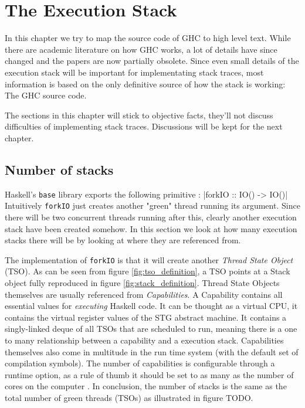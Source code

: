\chapter{The Execution Stack}

In this chapter we try to map the source code of GHC to high level text.
While there are academic literature on how GHC works, a lot of details have
since changed and the papers are now partially obsolete. Since even
small details of the execution stack will be important for implementating stack traces,
most information is based on the only definitive source of how the
stack is working: The GHC source code.

The sections in this chapter will stick to objective facts,
they'll not discuss difficulties of implementing stack traces.
Discussions will be kept for the next chapter.

\section{Number of stacks}

Haskell's \texttt{base} library exports the following primitive \cite{base_forkIO}:
|forkIO :: IO() -> IO()|
Intuitively \texttt{forkIO} just creates another "green" thread running its argument.
Since there will be two concurrent threads running after this, clearly
another execution stack have been created somehow. In this section we
look at how many execution stacks there will be by looking at
where they are referenced from.

The implementation of \texttt{forkIO} is
that it will create another \emph{Thread State Object} (TSO). As
can be seen from figure \ref{fig:tso_definition}, a TSO points at a
Stack object fully reproduced in figure \ref{fig:stack_definition}.
Thread State Objects themselves are usually referenced from \emph{Capabilities}.
A Capability contains all essential values for \emph{executing}
Haskell code. It can be thought as a virtual CPU, it contains
the virtual register values of the STG abstract machine. It contains
a singly-linked deque of all TSOs that are scheduled to run, meaning
there is a one to many relationship between a capability and a execution
stack. Capabilities themselves also come in multitude in the run time
system (with the default set of compilation symbols). The number of
capabilities is configurable through a runtime option, as a rule of
thumb it should be set to as many as the number of cores on the computer
\cite{commentary_capabilities}. In conclusion, the number of stacks is
the same as the total number of green threads (TSOs) as illustrated in
figure TODO.

